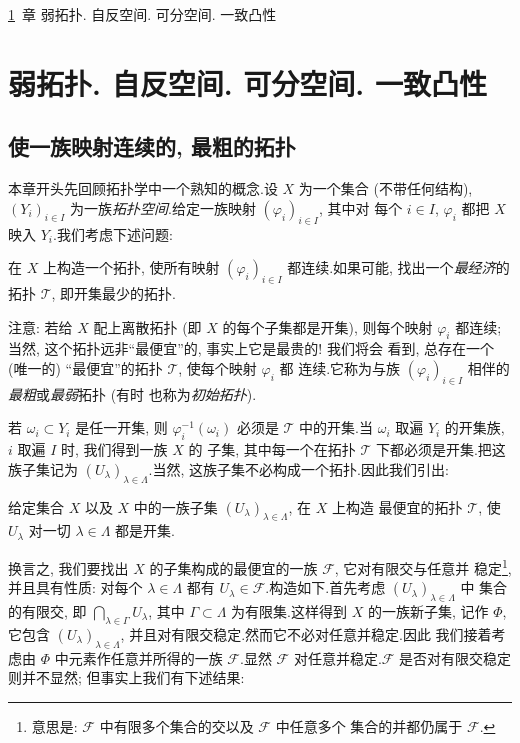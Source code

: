 \ref{chap:3}~章 
弱拓扑. 
自反空间. 
可分空间. 
一致凸性

\chapter{弱拓扑. 自反空间. 可分空间. 一致凸性}
\label{chap:3}

\section{使一族映射连续的, 最粗的拓扑}
\label{sec:3.1}

本章开头先回顾拓扑学中一个熟知的概念.设 $X$ 为一个集合 (不带任何结构),
$(Y_i)_{i\in I}$ 为一族\emph{拓扑空间}.给定一族映射 $(\varphi_i)_{i\in I}$, 其中对
每个 $i\in I$, $\varphi_i$ 都把 $X$ 映入 $Y_i$.我们考虑下述问题:

在 $X$ 上构造一个拓扑, 使所有映射 $(\varphi_i)_{i\in I}$ 都连续.如果可能,
找出一个\emph{最经济}的拓扑 $\mathcal{T}$, 即开集最少的拓扑.

注意: 若给 $X$ 配上离散拓扑 (即 $X$ 的每个子集都是开集), 则每个映射
$\varphi_i$ 都连续; 当然, 这个拓扑远非``最便宜''的, 事实上它是最贵的! 我们将会
看到, 总存在一个 (唯一的) ``最便宜''的拓扑 $\mathcal{T}$, 使每个映射 $\varphi_i$ 都
连续.它称为与族 $(\varphi_i)_{i\in I}$ 相伴的\emph{最粗}或\emph{最弱}拓扑 (有时
也称为\emph{初始拓扑}).

若 $\omega_i\subset Y_i$ 是任一开集, 则 $\varphi_i^{-1}(\omega_i)$ 必须是 $\mathcal{T}$
中的开集.当 $\omega_i$ 取遍 $Y_i$ 的开集族, $i$ 取遍 $I$ 时, 我们得到一族 $X$ 的
子集, 其中每一个在拓扑 $\mathcal{T}$ 下都必须是开集.把这族子集记为
$(U_\lambda)_{\lambda\in\Lambda}$.当然, 这族子集不必构成一个拓扑.因此我们引出:

给定集合 $X$ 以及 $X$ 中的一族子集 $(U_\lambda)_{\lambda\in\Lambda}$, 在 $X$ 上构造
最便宜的拓扑 $\mathcal{T}$, 使 $U_\lambda$ 对一切 $\lambda\in\Lambda$ 都是开集.

换言之, 我们要找出 $X$ 的子集构成的最便宜的一族 $\mathcal{F}$, 它对有限交与任意并
稳定\footnote{意思是: $\mathcal{F}$ 中有限多个集合的交以及 $\mathcal{F}$ 中任意多个
集合的并都仍属于 $\mathcal{F}$.}, 并且具有性质: 对每个 $\lambda\in\Lambda$ 都有
$U_\lambda\in\mathcal{F}$.构造如下.首先考虑 $(U_\lambda)_{\lambda\in\Lambda}$ 中
集合的有限交, 即 $\bigcap_{\lambda\in\Gamma}U_\lambda$, 其中 $\Gamma\subset\Lambda$
为有限集.这样得到 $X$ 的一族新子集, 记作 $\Phi$, 它包含
$(U_\lambda)_{\lambda\in\Lambda}$, 并且对有限交稳定.然而它不必对任意并稳定.因此
我们接着考虑由 $\Phi$ 中元素作任意并所得的一族 $\mathcal{F}$.显然 $\mathcal{F}$
对任意并稳定.$\mathcal{F}$ 是否对有限交稳定则并不显然; 但事实上我们有下述结果:

